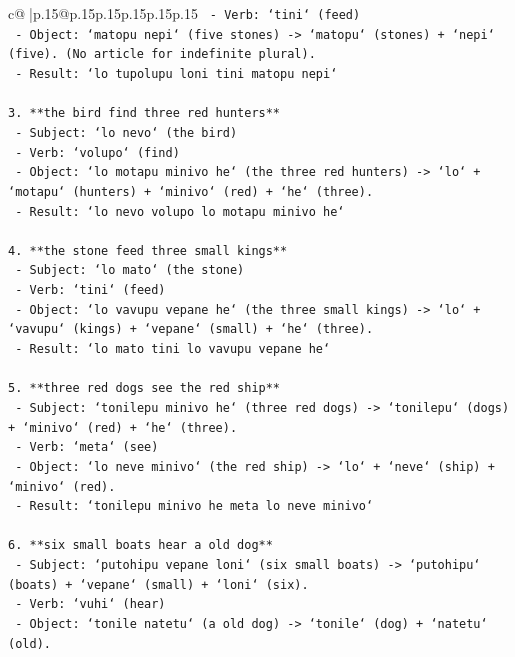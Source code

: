 \documentclass{article}
\begin{document}
{\begin{supertabular}{c@{$\;$}|p{.15\linewidth}@{}p{.15\linewidth}p{.15\linewidth}p{.15\linewidth}p{.15\linewidth}p{.15\linewidth}}
{{{\texttt{   {-} Verb: `tini` (feed)} \\
\texttt{   {-} Object: `matopu nepi` (five stones) {-}> `matopu` (stones) + `nepi` (five). (No article for indefinite plural).} \\
\texttt{   {-} Result: `lo tupolupu loni tini matopu nepi`} \\
\\ 
\texttt{3. **the bird find three red hunters**} \\
\texttt{   {-} Subject: `lo nevo` (the bird)} \\
\texttt{   {-} Verb: `volupo` (find)} \\
\texttt{   {-} Object: `lo motapu minivo he` (the three red hunters) {-}> `lo` + `motapu` (hunters) + `minivo` (red) + `he` (three).} \\
\texttt{   {-} Result: `lo nevo volupo lo motapu minivo he`} \\
\\ 
\texttt{4. **the stone feed three small kings**} \\
\texttt{   {-} Subject: `lo mato` (the stone)} \\
\texttt{   {-} Verb: `tini` (feed)} \\
\texttt{   {-} Object: `lo vavupu vepane he` (the three small kings) {-}> `lo` + `vavupu` (kings) + `vepane` (small) + `he` (three).} \\
\texttt{   {-} Result: `lo mato tini lo vavupu vepane he`} \\
\\ 
\texttt{5. **three red dogs see the red ship**} \\
\texttt{   {-} Subject: `tonilepu minivo he` (three red dogs) {-}> `tonilepu` (dogs) + `minivo` (red) + `he` (three).} \\
\texttt{   {-} Verb: `meta` (see)} \\
\texttt{   {-} Object: `lo neve minivo` (the red ship) {-}> `lo` + `neve` (ship) + `minivo` (red).} \\
\texttt{   {-} Result: `tonilepu minivo he meta lo neve minivo`} \\
\\ 
\texttt{6. **six small boats hear a old dog**} \\
\texttt{   {-} Subject: `putohipu vepane loni` (six small boats) {-}> `putohipu` (boats) + `vepane` (small) + `loni` (six).} \\
\texttt{   {-} Verb: `vuhi` (hear)} \\
\texttt{   {-} Object: `tonile natetu` (a old dog) {-}> `tonile` (dog) + `natetu` (old).} \\
}}}
\end{supertabular}}
\end{document}
